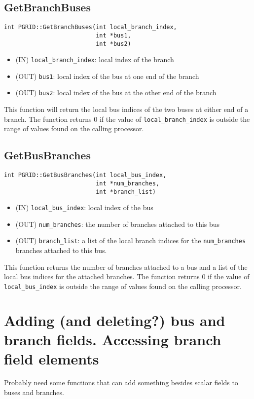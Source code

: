 \documentclass[12pt]{article}
\begin{document}
\subsection{GetBranchBuses}
\begin{verbatim}
int PGRID::GetBranchBuses(int local_branch_index,
                          int *bus1,
                          int *bus2)
\end{verbatim}
\begin{itemize}
\item (IN) \texttt{local\_branch\_index}: local index of the branch
\item (OUT) \texttt{bus1}: local index of the bus at one end of the branch
\item (OUT) \texttt{bus2}: local index of the bus at the other end of the
branch
\end{itemize}
This function will return the local bus indices of the two buses at either end
of a branch. The function returns 0 if the value of \texttt{local\_branch\_index} is
outside the range of values found on the calling processor.
\subsection{GetBusBranches}
\begin{verbatim}
int PGRID::GetBusBranches(int local_bus_index,
                          int *num_branches,
                          int *branch_list)
\end{verbatim}
\begin{itemize}
\item (IN) \texttt{local\_bus\_index}: local index of the bus
\item (OUT) \texttt{num\_branches}: the number of branches attached to this bus
\item (OUT) \texttt{branch\_list}: a list of the local branch indices for the
\texttt{num\_branches} branches attached to this bus.
\end{itemize}
This function returns the number of branches attached to a bus and a list of the
local bus indices for the attached branches. The function returns 0 if the value
of \texttt{local\_bus\_index} is outside the range of values found on the
calling processor.

\section{Adding (and deleting?) bus and branch fields. Accessing branch field
elements}
Probably need some functions that can add something besides scalar fields to
buses and branches.
\end{document}
